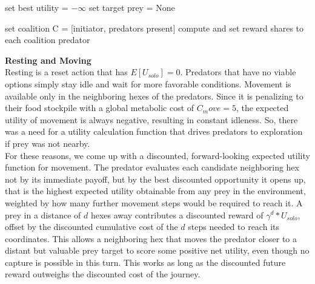 \documentclass[12pt,a4paper]{report}
\begin{document}
	\begin{algorithm}[H]
		
		\caption{Expected Utility Calculation for Coalition Hunt Action}
		\label{alg:Action_COALITION_HUNT_utility}
		
		
		
		\BlankLine
		
		set best utility = $-\infty$\;
		set target prey = None\;
		
		set coalition C = [initiator, predators present]\;
		compute and set reward shares to each coalition predator\;
		
	\end{algorithm}
	
	\vspace{1em}
	
	\textbf{Resting and Moving} \\

	Resting is a reset action that has $E[U_{solo}] = 0$. Predators that have no viable options simply stay idle and wait for more favorable conditions. Movement is available only in the neighboring hexes of the predators. Since it is penalizing to their food stockpile with a global metabolic cost of $C_move = 5$, the expected utility of movement is always negative, resulting in constant idleness. So, there was a need for a utility calculation function that drives predators to exploration if prey was not nearby. \\
	
	For these reasons, we come up with a discounted, forward-looking expected utility function for movement. The predator evaluates each candidate neighboring hex not by its immediate payoff, but by the best discounted opportunity it opens up, that is the highest expected utility obtainable from any prey in the environment, weighted by how many further movement steps would be required to reach it. A prey in a distance of $d$ hexes away contributes a discounted reward of $γ^d*U_{solo}$, offset by the discounted cumulative cost of the $d$ steps needed to reach its coordinates. This allows a neighboring hex that moves the predator closer to a distant but valuable prey target to score some positive net utility, even though no capture is possible in this turn. This works as long as the discounted future reward outweighs the discounted cost of the journey. \\
	
\end{document}
